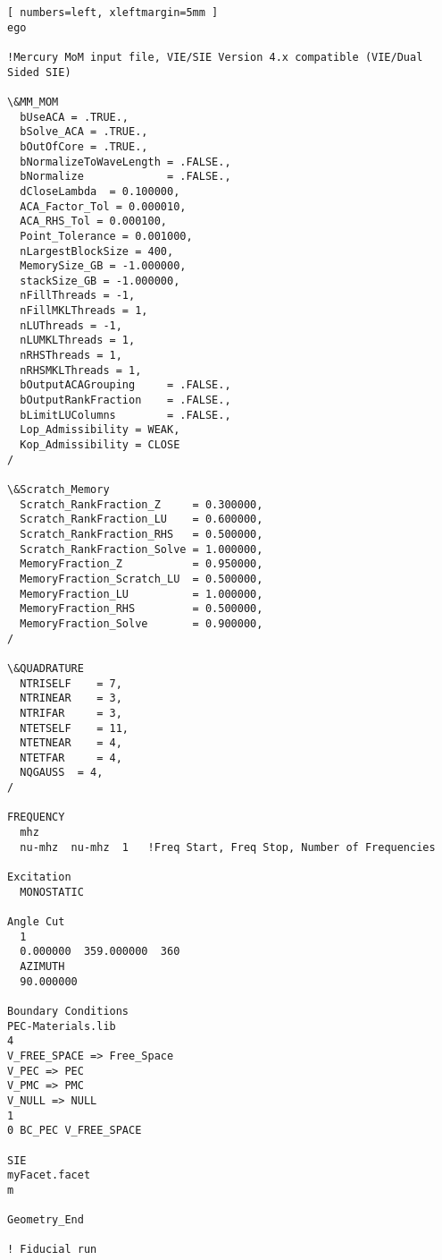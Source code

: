 \begin{Verbatim}[ numbers=left, xleftmargin=5mm ]
ego

!Mercury MoM input file, VIE/SIE Version 4.x compatible (VIE/Dual Sided SIE)

\&MM_MOM
  bUseACA = .TRUE.,
  bSolve_ACA = .TRUE.,
  bOutOfCore = .TRUE.,
  bNormalizeToWaveLength = .FALSE.,
  bNormalize             = .FALSE.,
  dCloseLambda  = 0.100000,
  ACA_Factor_Tol = 0.000010,
  ACA_RHS_Tol = 0.000100,
  Point_Tolerance = 0.001000,
  nLargestBlockSize = 400,
  MemorySize_GB = -1.000000,
  stackSize_GB = -1.000000,
  nFillThreads = -1,
  nFillMKLThreads = 1,
  nLUThreads = -1,
  nLUMKLThreads = 1,
  nRHSThreads = 1,
  nRHSMKLThreads = 1,
  bOutputACAGrouping     = .FALSE.,
  bOutputRankFraction    = .FALSE.,
  bLimitLUColumns        = .FALSE.,
  Lop_Admissibility = WEAK,
  Kop_Admissibility = CLOSE
/

\&Scratch_Memory
  Scratch_RankFraction_Z     = 0.300000,
  Scratch_RankFraction_LU    = 0.600000,
  Scratch_RankFraction_RHS   = 0.500000,
  Scratch_RankFraction_Solve = 1.000000,
  MemoryFraction_Z           = 0.950000,
  MemoryFraction_Scratch_LU  = 0.500000,
  MemoryFraction_LU          = 1.000000,
  MemoryFraction_RHS         = 0.500000,
  MemoryFraction_Solve       = 0.900000,
/

\&QUADRATURE
  NTRISELF    = 7,
  NTRINEAR    = 3,
  NTRIFAR     = 3,
  NTETSELF    = 11,
  NTETNEAR    = 4,
  NTETFAR     = 4,
  NQGAUSS  = 4,
/

FREQUENCY
  mhz
  nu-mhz  nu-mhz  1   !Freq Start, Freq Stop, Number of Frequencies

Excitation
  MONOSTATIC

Angle Cut
  1
  0.000000  359.000000  360
  AZIMUTH
  90.000000

Boundary Conditions
PEC-Materials.lib
4
V_FREE_SPACE => Free_Space
V_PEC => PEC
V_PMC => PMC
V_NULL => NULL
1
0 BC_PEC V_FREE_SPACE

SIE
myFacet.facet
m

Geometry_End

! Fiducial run
\end{Verbatim}

\endinput  %
